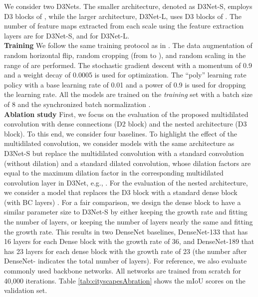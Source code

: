 \documentclass[final]{cvpr}
\begin{document}
We consider two D3Nets. The smaller architecture, denoted as D3Net-S, employs D3 blocks of , while the larger architecture, D3Net-L, uses D3 blocks of . The number of feature maps extracted from each scale using the feature extraction layers are  for D3Net-S, and  for D3Net-L. 
\vspace{3mm}\\
\textbf{Training} \hspace{1mm}
We follow the same training protocol as in \cite{zhao2017pspnet,zhao2018psanet}. The data augmentation of random horizontal flip, random cropping (from  to ), and random scaling in the range of  are performed.
The stochastic gradient descent with a momentum of 0.9 and a
weight decay of 0.0005 is used for optimization. 
The ``poly'' learning rate policy with a base learning rate of 0.01 and a power of 0.9 is used for dropping the learning rate. All the models are trained on the \textit{training} set with a batch size of 8 and the synchronized batch normalization \cite{Zhang18SyncBN}.
\vspace{3mm}\\
\textbf{Ablation study} \hspace{1mm}
First, we focus on the evaluation of the proposed multidilated convolution with dense connections (D2 block) and the nested architecture (D3 block). To this end, we consider four baselines. To highlight the effect of the multidilated convolution, we consider models with the same architecture as D3Net-S but replace the multidilated convolution with a standard convolution (without dilation) and a standard dilated convolution, whose dilation factors  are equal to the maximum dilation factor in the corresponding multidilated convolution layer in D3Net, e.g., . For the evaluation of the nested architecture, we consider a model that replaces the D3 block with a standard dense block (with BC layers) \cite{Huang17Densenet}. For a fair comparison, we design the dense block to have a similar parameter size to D3Net-S by either keeping the growth rate and fitting the number of layers, or keeping the number of layers nearly the same and fitting the growth rate. This results in two DenseNet baselines, DenseNet-133 that has 16 layers for each Dense block with the growth rate of 36, and DenseNet-189 that has 23 layers for each dense block with the growth rate of 23 (the number after DenseNet- indicates the total number of layers). For reference, we also evaluate commonly used backbone networks. All networks are trained from scratch for 40,000 iterations. Table \ref{tab:cityscapesAbration} shows the mIoU scores on the validation set.
\end{document}
